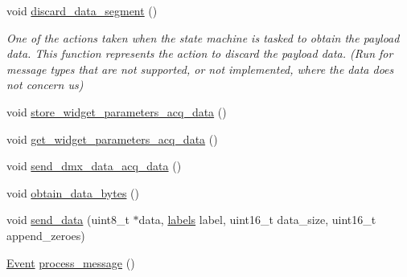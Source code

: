 \begin{DoxyCompactItemize}
void \hyperlink{classDMXPro_1_1Processor_a21649894efa9a8e88148b5832b15e4b0}{discard\+\_\+data\+\_\+segment} ()
\begin{DoxyCompactList}\small\item\em One of the actions taken when the state machine is tasked to obtain the payload data. This function represents the action to discard the payload data. (Run for message types that are not supported, or not implemented, where the data does not concern us) \end{DoxyCompactList}\item 
void \hyperlink{classDMXPro_1_1Processor_a30fe8b5251a30f8662dbb6d312c4fe25}{store\+\_\+widget\+\_\+parameters\+\_\+acq\+\_\+data} ()
\item 
void \hyperlink{classDMXPro_1_1Processor_aa2e16c41e09b7823570132f02d57ba34}{get\+\_\+widget\+\_\+parameters\+\_\+acq\+\_\+data} ()
\item 
void \hyperlink{classDMXPro_1_1Processor_a27f23f48cc4fe881915e813a972eb43b}{send\+\_\+dmx\+\_\+data\+\_\+acq\+\_\+data} ()
\item 
void \hyperlink{classDMXPro_1_1Processor_a1170e4aae92ed4bf740020e13602e648}{obtain\+\_\+data\+\_\+bytes} ()
\item 
void \hyperlink{classDMXPro_1_1Processor_a554484560a2dcc0d5763074a584074bb}{send\+\_\+data} (uint8\+\_\+t $\ast$data, \hyperlink{namespaceDMXPro_a001319de95203723f1bd253fec3186cd}{labels} label, uint16\+\_\+t data\+\_\+size, uint16\+\_\+t append\+\_\+zeroes)
\item 
\hyperlink{namespaceDMXPro_a0b4335b3ed2abbd803e6d33c54d6ac6d}{Event} \hyperlink{classDMXPro_1_1Processor_a21c28c13ee050cabdaabc6d869137dcc}{process\+\_\+message} ()
\end{DoxyCompactItemize}
